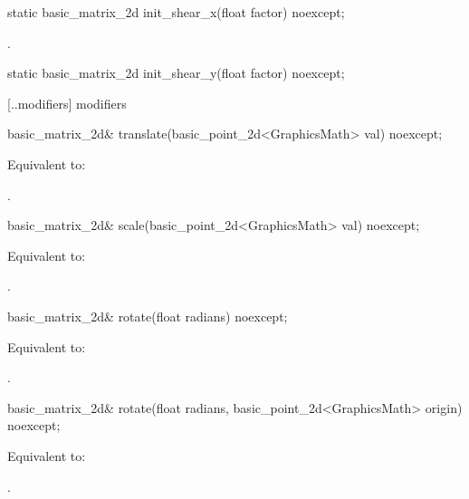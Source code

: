%
\begin{itemdecl}
static basic_matrix_2d init_shear_x(float factor) noexcept;
\end{itemdecl}
\begin{itemdescr}
\pnum
\returns
{}.
\end{itemdescr}

%
\begin{itemdecl}
static basic_matrix_2d init_shear_y(float factor) noexcept;
\end{itemdecl}
\begin{itemdescr}
\pnum
\returns
{}
\end{itemdescr}

 [\iotwod.\matrixtwod.modifiers] { modifiers}

%
\begin{itemdecl}
basic_matrix_2d& translate(basic_point_2d<GraphicsMath> val) noexcept;
\end{itemdecl}
\begin{itemdescr}
\pnum
\effects
Equivalent to: 

\pnum
\returns
{}.
\end{itemdescr}

%
\begin{itemdecl}
basic_matrix_2d& scale(basic_point_2d<GraphicsMath> val) noexcept;
\end{itemdecl}
\begin{itemdescr}
\pnum
\effects
Equivalent to: 

\pnum
\returns
{}.
\end{itemdescr}

%
\begin{itemdecl}
basic_matrix_2d& rotate(float radians) noexcept;
\end{itemdecl}
\begin{itemdescr}
\pnum
\effects
Equivalent to: 

\pnum
\returns
{}.
\end{itemdescr}

%
\begin{itemdecl}
basic_matrix_2d& rotate(float radians, basic_point_2d<GraphicsMath> origin) noexcept;
\end{itemdecl}
\begin{itemdescr}
\pnum
\effects
Equivalent to: 

\pnum
\returns
{}.
\end{itemdescr}

